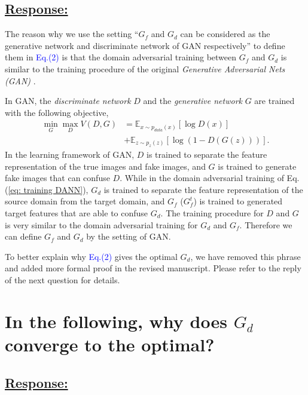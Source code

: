 \subsection*{\underline{\textbf{Response:}}}

The reason why we use the setting ``$G_f$ and $G_d$ can be considered as the generative network and discriminate network of GAN respectively'' to define them in \textcolor{blue}{Eq.(2)} is that the domain adversarial training between $G_f$ and $G_d$ is similar to the training procedure of the original \textit{Generative Adversarial Nets (GAN)} \cite{goodfellow2014generative}.

In GAN, the \textit{discriminate network} $D$ and the \textit{generative network} $G$ are trained with the following objective,
\begin{equation}
    \label{eq: GAN}
    \begin{split}
        \min_G \max_D V(D,G) &= \mathbb{E}_{x\sim p_{data}(x)}[\log D(x)] \\ &+ \mathbb{E}_{z\sim p_z(z)}[\log (1-D(G(z)))].
    \end{split}
\end{equation}
In the learning framework of GAN, $D$ is trained to separate the feature representation of the true images and fake images, and $G$ is trained to generate fake images that can confuse $D$.
While in the domain adversarial training of Eq.(\ref{eq: training DANN}), $G_d$ is trained to separate the feature representation of the source domain from the target domain, and $G_f$ ($G_f^t$) is trained to generated target features that are able to confuse $G_d$.
The training procedure for $D$ and $G$ is very similar to the domain adversarial training for $G_d$ and $G_f$.
Therefore we can define $G_f$ and $G_d$ by the setting of GAN.

To better explain why \textcolor{blue}{Eq.(2)} gives the optimal $G_d$, we have removed this phrase and added more formal proof in the revised manuscript.
Please refer to the reply of the next question for details.

\section{In the following, why does $G_d$ converge to the optimal?}
\subsection*{\underline{\textbf{Response:}}}

